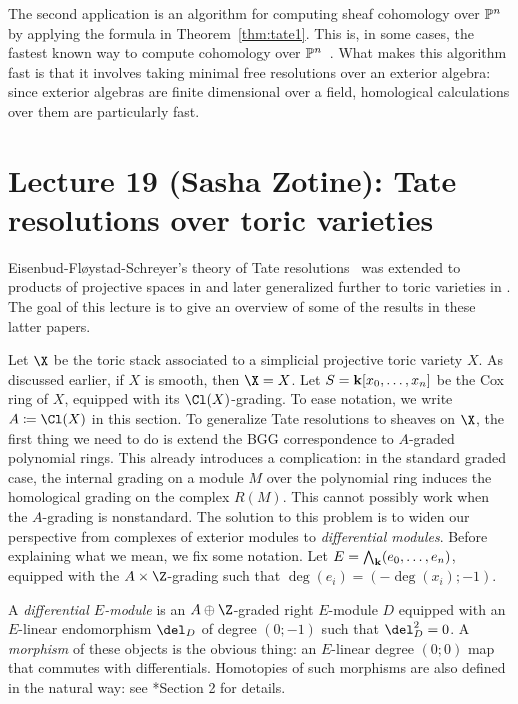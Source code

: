 \documentclass{amsart}
\begin{document}
The second application is an algorithm for computing sheaf cohomology over $\mathbb P^n$ by applying the formula in Theorem~\ref{thm:tate1}. This is, in some cases, the fastest known way to compute cohomology over $\mathbb P^n$~\cite{DE02}. What makes this algorithm fast is that it involves taking minimal free resolutions over an exterior algebra: since exterior algebras are finite dimensional over a field, homological calculations over them are particularly fast.

\section{Lecture 19 (Sasha Zotine): Tate resolutions over toric varieties}\label{lec:19-tate-resolutions-toric}

Eisenbud-Fl\o ystad-Schreyer's theory of Tate resolutions~\cite{EFS03} was extended to products of projective spaces in \cite{EES15} and later generalized further to toric varieties in \cite{BE24b, BEfuture}. The goal of this lecture is to give an overview of some of the results in these latter papers.

Let $\X$ be the toric stack associated to a simplicial projective toric variety $X$. As discussed earlier, if $X$ is smooth, then $\X = X$. Let $S = \mathbf{k}[x_0, \dots, x_n]$ be the Cox ring of $X$, equipped with its $\Cl(X)$-grading. To ease notation, we write $A \ce \Cl(X)$ in this section. To generalize Tate resolutions to sheaves on $\X$, the first thing we need to do is extend the BGG correspondence to $A$-graded polynomial rings. This already introduces a complication: in the standard graded case, the internal grading on a module $M$ over the polynomial ring induces the homological grading on the complex $R(M)$. This cannot possibly work when the $A$-grading is nonstandard. The solution to this problem is to widen our perspective from complexes of exterior modules to \emph{differential modules}. Before explaining what we mean, we fix some notation. Let $E = \bigwedge_{\mathbf{k}}(e_0, \dots, e_n)$, equipped with the $A \times \Z$-grading such that $\deg(e_i) = (-\deg(x_i); -1)$.

\begin{defn}
  A \emph{differential $E$-module} is an $A \oplus \Z$-graded right $E$-module $D$ equipped with an $E$-linear endomorphism $\del_D$ of degree $(0;-1)$ such that $\del_D^2 = 0$. A \emph{morphism} of these objects is the obvious thing: an $E$-linear degree $(0;0)$ map that commutes with differentials. Homotopies of such morphisms are also defined in the natural way: see \cite{BE24b}*{Section 2} for details.
\end{defn}
\end{document}
